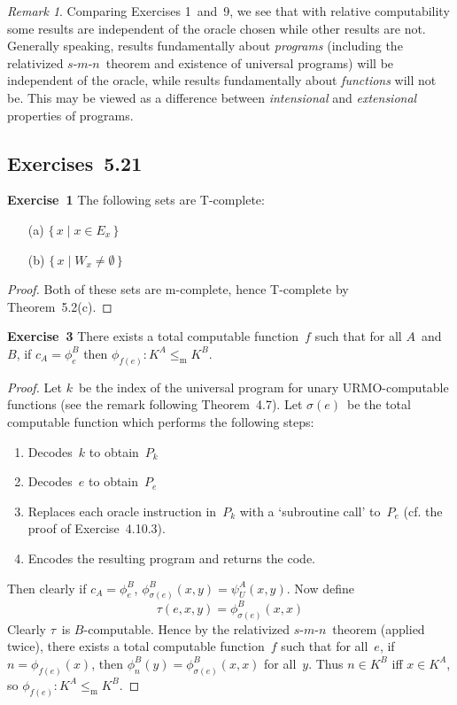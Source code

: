 \documentclass[letterpaper]{article}
\newcommand{\exercise}[2][]{\noindent\textbf{Exercise~{#2}}\ifthenelse{\isempty{#1}}{\textbf{.}}{ ({#1})\textbf{.}}}
\newcommand{\mr}{\mathrel{\le_{\mathrm{m}}}}
\newcommand{\smn}{$s$-$m$-$n$}
\theoremstyle{plain}
\theoremstyle{definition}
\theoremstyle{remark}
\newtheorem*{rmk}{Remark}
\begin{document}
\begin{rmk}
Comparing Exercises 1~and~9, we see that with relative computability some results are independent of the oracle chosen while other results are not. Generally speaking, results fundamentally about \emph{programs} (including the relativized \smn\ theorem and existence of universal programs) will be independent of the oracle, while results fundamentally about \emph{functions} will not be. This may be viewed as a difference between \emph{intensional} and \emph{extensional} properties of programs.
\end{rmk}

\subsection*{Exercises~5.21}
\exercise{1}
The following sets are T-complete:
\begin{enumerate}[itemsep=0pt]
\item[(a)] $\{\,x\mid x\in E_x\,\}$
\item[(b)] $\{\,x\mid W_x\ne\emptyset\,\}$
\end{enumerate}
\begin{proof}
Both of these sets are m-complete, hence T-complete by Theorem~5.2(c).
\end{proof}

\exercise{3}
There exists a total computable function~$f$ such that for all $A$~and~$B$, if $c_A=\phi_e^B$ then $\phi_{f(e)}:K^A\mr K^B$.
\begin{proof}
Let $k$~be the index of the universal program for unary URMO-computable functions (see the remark following Theorem~4.7). Let $\sigma(e)$~be the total computable function which performs the following steps:
\begin{enumerate}[itemsep=0pt]
\item Decodes~$k$ to obtain~$P_k$
\item Decodes~$e$ to obtain~$P_e$
\item Replaces each oracle instruction in~$P_k$ with a `subroutine call' to~$P_e$ (cf. the proof of Exercise~4.10.3).
\item Encodes the resulting program and returns the code.
\end{enumerate}
Then clearly if $c_A=\phi_e^B$, $\phi_{\sigma(e)}^B(x,y)=\psi_U^A(x,y)$. Now define
$$\tau(e,x,y)=\phi_{\sigma(e)}^B(x,x)$$
Clearly $\tau$~is $B$-computable. Hence by the relativized \smn\ theorem (applied twice), there exists a total computable function~$f$ such that for all~$e$, if $n=\phi_{f(e)}(x)$, then $\phi_n^B(y)=\phi_{\sigma(e)}^B(x,x)$ for all~$y$. Thus $n\in K^B$ iff $x\in K^A$, so $\phi_{f(e)}:K^A\mr K^B$.
\end{proof}
\end{document}

